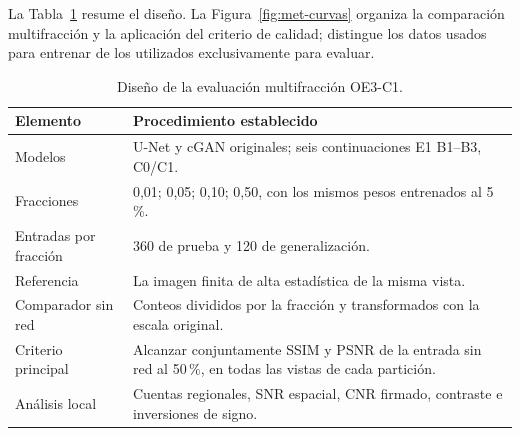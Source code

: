 La Tabla~\ref{tab:met-complemento} resume el diseño. La Figura~\ref{fig:met-curvas} organiza la comparación multifracción y la aplicación del criterio de calidad; distingue los datos usados para entrenar de los utilizados exclusivamente para evaluar.
\begin{table}[htbp]\centering\small
\caption{Diseño de la evaluación multifracción OE3-C1.}\label{tab:met-complemento}
\begin{tabularx}{\linewidth}{@{}p{4.1cm}X@{}}\toprule
Elemento & Procedimiento establecido\\\midrule
Modelos & U-Net y cGAN originales; seis continuaciones E1 B1--B3, C0/C1.\\
Fracciones & 0,01; 0,05; 0,10; 0,50, con los mismos pesos entrenados al 5\,\%.\\
Entradas por fracción & 360 de prueba y 120 de generalización.\\
Referencia & La imagen finita de alta estadística de la misma vista.\\
Comparador sin red & Conteos divididos por la fracción y transformados con la escala original.\\
Criterio principal & Alcanzar conjuntamente SSIM y PSNR de la entrada sin red al 50\,\%, en todas las vistas de cada partición.\\
Análisis local & Cuentas regionales, SNR espacial, CNR firmado, contraste e inversiones de signo.\\\bottomrule
\end{tabularx}\end{table}

